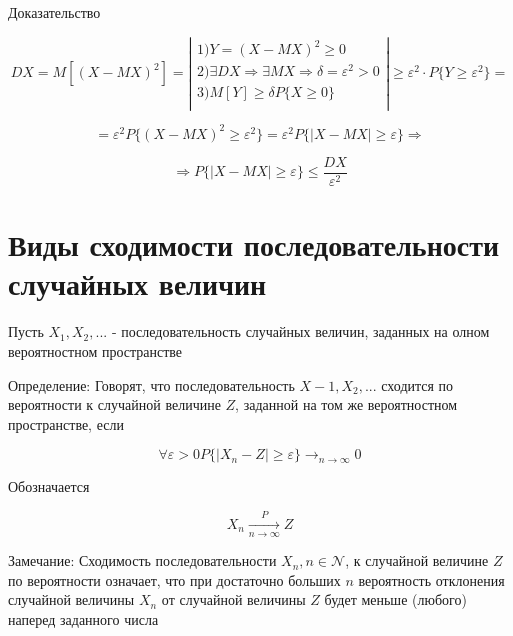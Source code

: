 Доказательство

\begin{equation*}
    DX = M[(X-MX)^2] =
    \left|
    \begin{matrix}
        1) Y = (X-MX)^2 \geq 0 \\
        2) \exists DX \Rightarrow \exists MX \Rightarrow \delta = \varepsilon^2 > 0 \\
        3) M[Y] \geq \delta P\{X \geq 0\} \\
    \end{matrix}
    \right| \geq \varepsilon^2 \cdot P\{Y \geq \varepsilon^2 \} =
\end{equation*}

\begin{equation*}
    = \varepsilon^2 P\{ (X - MX)^2 \geq \varepsilon^2 \} = \varepsilon^2 P\{|X-MX| \geq \varepsilon\} \Rightarrow
\end{equation*}

\begin{equation*}
    \Rightarrow P\{|X-MX| \geq \varepsilon \} \le \frac{DX}{\varepsilon^2}
\end{equation*}

\section{Виды сходимости последовательности случайных величин}

Пусть $X_1,X_2,...$ - последовательность случайных величин, заданных на олном вероятностном пространстве

Определение: Говорят, что последовательность $X-1, X_2,...$ сходится по вероятности к случайной величине $Z$, заданной на том же вероятностном пространстве, если

\begin{equation*}
    \forall \varepsilon > 0 P\{ |X_n - Z| \geq \varepsilon \} \to_{n \to \infty} 0
\end{equation*}

Обозначается

\begin{equation*}
    X_n \xrightarrow[n\to\infty]{P} Z
\end{equation*}

Замечание: Сходимость последовательности $X_n, n \in \mathcal N$, к случайной величине $Z$ по вероятности означает, что при достаточно больших $n$ вероятность отклонения случайной величины $X_n$ от случайной величины $Z$ будет меньше (любого) наперед заданного числа

